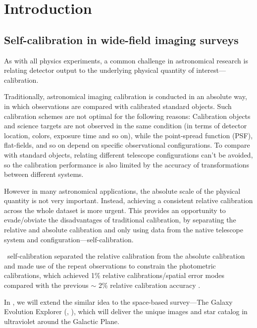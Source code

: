 \chapter*{Introduction}

\newcommand{\pdc}{\project{PDC}}


\section{Self-calibration in wide-field imaging surveys}
As with all physics experiments, a common challenge in astronomical research is relating detector output to the underlying physical quantity of interest---calibration.

Traditionally, astronomical imaging calibration is conducted in an absolute way, in which observations are compared with calibrated standard objects.
Such calibration schemes are not optimal for the following reasons:
Calibration objects and science targets are not observed in the same condition (in terms of detector location, colors, exposure time and so on), while the point-spread function (PSF), flat-fields, and so on depend on specific observational configurations.
To compare with standard objects, relating different telescope configurations can't be avoided, so the calibration performance is also limited by the accuracy of transformations between different systems.

However in many astronomical applications,  the absolute scale of the physical quantity is not very important.
Instead, achieving a consistent relative calibration across the whole dataset is more urgent.
This provides an opportunity to evade/obviate the disadvantages of traditional calibration, by separating the relative and absolute calibration and only using data from the native telescope system and configuration---self-calibration.

\sdss\ self-calibration \citep{uber} separated the relative calibration from the absolute calibration and made use of the repeat observations to constrain the photometric calibrations, which achieved 1\% relative calibrations/spatial error modes compared with the  previous $\sim$ 2\% relative calibration accuracy \citep{sdss2}.

In , we will extend the similar idea to the space-based survey---The Galaxy Evolution Explorer (\galex, \citealt{galex1}), which will deliver the unique images and star catalog in ultraviolet around the Galactic Plane. 

